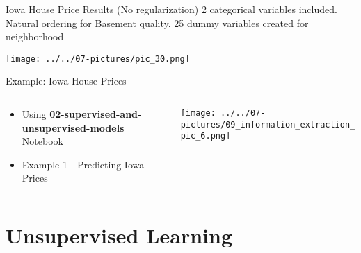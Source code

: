 \documentclass[11pt]{beamer}
\begin{document}
\begin{frame}{Iowa House Price Results (No regularization)}
	2 categorical variables included. Natural ordering for Basement quality. 25 dummy variables created for neighborhood
	\begin{center}
	\texttt{[image: ../../07-pictures/pic\_30.png]}
	\end{center}
\end{frame}
\begin{frame}{Example: Iowa House Prices}
\begin{columns}[T] %
\begin{column}{.48\textwidth}
        \begin{itemize}
		\item Using \textbf{02-supervised-and-unsupervised-models} Notebook 
		\item Example 1 - Predicting Iowa Prices
        \end{itemize}
\end{column}%
\hfill%
\begin{column}{.48\textwidth}
        \texttt{[image: ../../07-pictures/09\_information\_extraction\_pic\_6.png]}
\end{column}%
\end{columns}
\end{frame}
\section{Unsupervised Learning}
\end{document}
